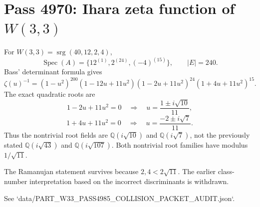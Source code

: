 
\section*{Pass 4970: Ihara zeta function of $W(3,3)$}
For $W(3,3)=\operatorname{srg}(40,12,2,4)$,
\[
\operatorname{Spec}(A)=\{12^{(1)},2^{(24)},(-4)^{(15)}\},\qquad |E|=240.
\]
Bass' determinant formula gives
\[
\zeta(u)^{-1}=(1-u^2)^{200}(1-12u+11u^2)(1-2u+11u^2)^{24}(1+4u+11u^2)^{15}.
\]
The exact quadratic roots are
\[
1-2u+11u^2=0\quad\Longrightarrow\quad u=\frac{1\pm i\sqrt{10}}{11},
\]
\[
1+4u+11u^2=0\quad\Longrightarrow\quad u=\frac{-2\pm i\sqrt7}{11}.
\]
Thus the nontrivial root fields are $\mathbb Q(i\sqrt{10})$ and $\mathbb Q(i\sqrt7)$, not the previously stated $\mathbb Q(i\sqrt{43})$ and $\mathbb Q(i\sqrt{107})$. Both nontrivial root families have modulus $1/\sqrt{11}$.

The Ramanujan statement survives because $2,4<2\sqrt{11}$. The earlier class-number interpretation based on the incorrect discriminants is withdrawn.

See `data/PART_W33_PASS4985_COLLISION_PACKET_AUDIT.json`.
